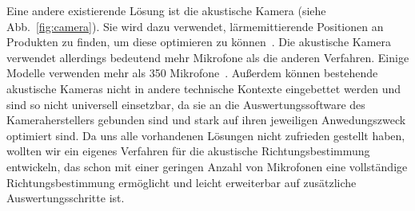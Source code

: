 Eine andere existierende Lösung ist die akustische Kamera (siehe Abb.~\ref{fig:camera}). Sie wird dazu verwendet, lärmemittierende Positionen an Produkten zu finden, um diese optimieren zu können~\cite{camera}. Die akustische Kamera verwendet allerdings bedeutend mehr Mikrofone als die anderen Verfahren. Einige Modelle verwenden mehr als \num{350} Mikrofone~\cite{nmics}. Außerdem können bestehende akustische Kameras nicht in andere technische Kontexte eingebettet werden und sind so nicht universell einsetzbar, da sie an die Auswertungssoftware des Kameraherstellers gebunden sind und stark auf ihren jeweiligen Anwedungszweck optimiert sind. Da uns alle vorhandenen Lösungen nicht zufrieden gestellt haben, wollten wir ein eigenes Verfahren für die akustische Richtungsbestimmung entwickeln, das schon mit einer geringen Anzahl von Mikrofonen eine vollständige Richtungsbestimmung ermöglicht und leicht erweiterbar auf zusätzliche Auswertungsschritte ist.
